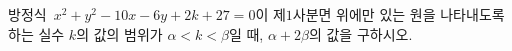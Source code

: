 방정식~$x^2+y^2-10x-6y+2k+27=0$이 제$1$사분면 위에만 있는 원을 나타내도록 하는 실수 $k$의 값의 범위가 $\alpha<k<\beta$일 때, $\alpha+2\beta$의 값을 구하시오.
